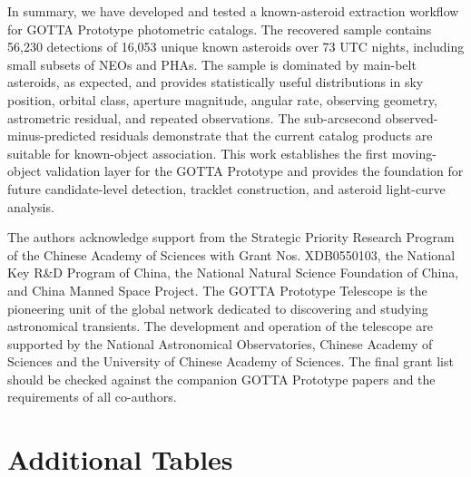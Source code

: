 \documentclass[referee]{raa}
\begin{document}
In summary, we have developed and tested a known-asteroid extraction workflow for GOTTA Prototype photometric catalogs. The recovered sample contains 56,230 detections of 16,053 unique known asteroids over 73 UTC nights, including small subsets of NEOs and PHAs. The sample is dominated by main-belt asteroids, as expected, and provides statistically useful distributions in sky position, orbital class, aperture magnitude, angular rate, observing geometry, astrometric residual, and repeated observations. The sub-arcsecond observed-minus-predicted residuals demonstrate that the current catalog products are suitable for known-object association. This work establishes the first moving-object validation layer for the GOTTA Prototype and provides the foundation for future candidate-level detection, tracklet construction, and asteroid light-curve analysis.

\begin{acknowledgements}
The authors acknowledge support from the Strategic Priority Research Program of the Chinese Academy of Sciences with Grant Nos. XDB0550103, the National Key R\&D Program of China, the National Natural Science Foundation of China, and China Manned Space Project. The GOTTA Prototype Telescope is the pioneering unit of the global network dedicated to discovering and studying astronomical transients. The development and operation of the telescope are supported by the National Astronomical Observatories, Chinese Academy of Sciences and the University of Chinese Academy of Sciences. The final grant list should be checked against the companion GOTTA Prototype papers and the requirements of all co-authors.
\end{acknowledgements}

\appendix
\section{Additional Tables}


\end{document}
